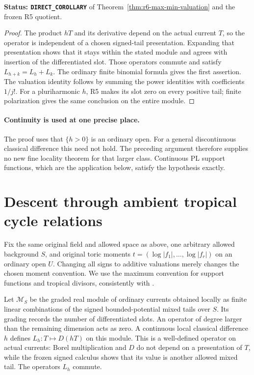 \documentclass[11pt,a4paper]{article}
\numberwithin{equation}{section}
\theoremstyle{definition}
\theoremstyle{remark}
\begin{document}
\noindent\textbf{Status: \texttt{DIRECT\_COROLLARY}} of
Theorem~\ref{thm:r6-max-min-valuation} and the frozen R5 quotient.

\begin{proof}
The product $hT$ and its derivative depend on the actual
current $T$, so the operator is independent of a chosen
signed-tail presentation. Expanding that presentation
shows that it stays within the stated module and agrees
with insertion of the differentiated slot. Those operators
commute and satisfy $L_{h+k}=L_h+L_k$. The ordinary finite
binomial formula gives the first assertion. The valuation
identity follows by summing the power identities with
coefficients $1/j!$. For a pluriharmonic $h$, R5 makes its
slot zero on every positive tail; finite polarization
gives the same conclusion on the entire module.
\end{proof}

\paragraph{Continuity is used at one precise place.}
The proof uses that $\{h>0\}$ is an ordinary open. For a
general discontinuous classical difference this need not
hold. The preceding argument therefore supplies no new
fine locality theorem for that larger class. Continuous
PL support functions, which are the application below,
satisfy the hypothesis exactly.



\section{Descent through ambient tropical cycle relations}
\label{sec:r6-ambient-polytope-action}

Fix the same original field and allowed space as above, one
arbitrary allowed background $S$, and original toric moments
$t=(\log|f_1|,\ldots,\log|f_r|)$ on an ordinary open $U$.
Changing all signs to additive valuations merely changes
the chosen moment convention. We use the maximum convention
for support functions and tropical divisors, consistently
with \cite[Notations and conventions, p.~3]{JY16}.

Let $\mathscr M_S$ be the graded real module of ordinary
currents obtained locally as finite linear combinations of
the signed bounded-potential mixed tails over $S$. Its
grading records the number of differentiated slots. An
operator of degree larger than the remaining dimension
acts as zero. A continuous local classical difference $h$
defines $L_h:T\mapsto D(hT)$ on this module. This is a
well-defined operator on actual currents: Borel
multiplication and $D$ do not depend on a presentation of
$T$, while the frozen signed calculus shows that its value
is another allowed mixed tail. The operators $L_h$ commute.
\end{document}
